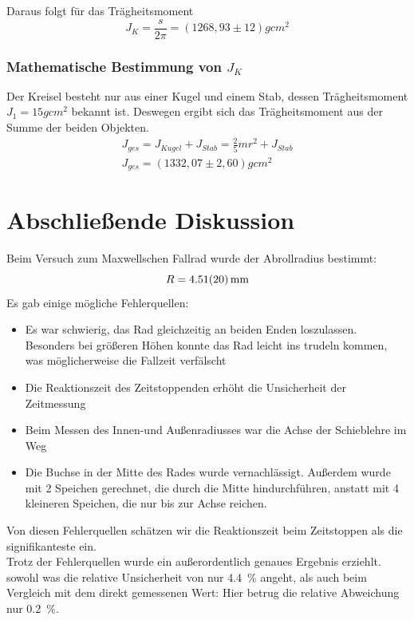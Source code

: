 Daraus folgt für das Trägheitsmoment
\begin{equation}
J_K=\frac{s}{2\pi}=(1268,93\pm 12)gcm^2
\end{equation}

\subsubsection{Mathematische Bestimmung von $J_K$}
Der Kreisel besteht nur aus einer Kugel und einem Stab, dessen Trägheitsmoment $J_1=15gcm^2$ bekannt ist. Deswegen ergibt sich das Trägheitsmoment aus der Summe der beiden Objekten.
\begin{gather}
J_{ges}=J_{Kugel}+J_{Stab}
= \frac{2}{5} m r^2 + J_{Stab}\\
J_{ges}= (1332,07\pm 2,60)gcm^2
\end{gather}
\section{Abschließende Diskussion}
Beim Versuch zum Maxwellschen Fallrad wurde der Abrollradius bestimmt:
\begin{equation}
  R=\SI{4.51\pm0.20}{mm}
  \label{eq:abrollradius_wiederholt}
\end{equation}
Es gab einige mögliche Fehlerquellen:
\begin{itemize}
  \item Es war schwierig, das Rad gleichzeitig an beiden Enden loszulassen. Besonders bei größeren Höhen konnte das Rad leicht ins trudeln kommen, was möglicherweise die Fallzeit verfälscht
  \item Die Reaktionszeit des Zeitstoppenden erhöht die Unsicherheit der Zeitmessung
  \item Beim Messen des Innen-und Außenradiusses war die Achse der Schieblehre im Weg
  \item Die Buchse in der Mitte des Rades wurde vernachlässigt. Außerdem wurde mit 2 Speichen gerechnet, die durch die Mitte hindurchführen, anstatt mit 4 kleineren Speichen, die nur bis zur Achse reichen.
\end{itemize}
Von diesen Fehlerquellen schätzen wir die Reaktionszeit beim Zeitstoppen als die signifikanteste ein. \\

Trotz der Fehlerquellen wurde ein außerordentlich genaues Ergebnis erziehlt. sowohl was die relative Unsicherheit von nur \SI{4.4}{\percent} angeht, als auch beim Vergleich mit dem direkt gemessenen Wert: Hier betrug die relative Abweichung nur \SI{0.2}{\percent}.

